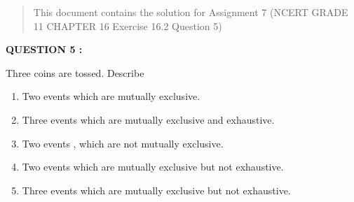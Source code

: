 \documentclass[journal,12pt,twocolumn]{IEEEtran}
\begin{document}
\maketitle
%
%
\begin{abstract}
This document contains the solution for Assignment 7 (NCERT GRADE 11 CHAPTER 16 Exercise 16.2 Question 5)
\end{abstract}
\textbf{QUESTION 5 :}

Three coins are tossed. Describe 
\begin{enumerate}[label=(\roman{enumi})]
    \item Two events which are mutually exclusive.
    \item Three events which are mutually exclusive and exhaustive.
    \item Two events , which are not mutually exclusive.
    \item Two events which are mutually exclusive but not exhaustive.
    \item Three events which are mutually exclusive but not exhaustive.
\end{enumerate}
\end{document}
